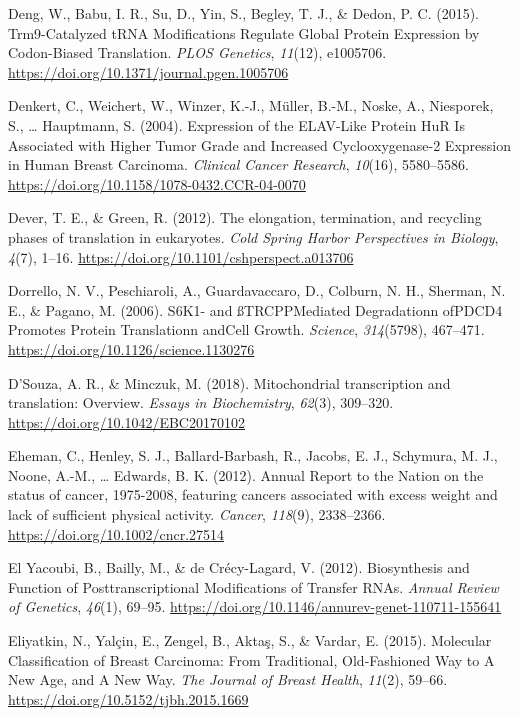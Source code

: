 \documentclass[12pt,openany]{book}
\begin{document}
\hypertarget{ref-Deng2015}{}
Deng, W., Babu, I. R., Su, D., Yin, S., Begley, T. J., \& Dedon, P. C.
(2015). Trm9-Catalyzed tRNA Modifications Regulate Global Protein
Expression by Codon-Biased Translation. \emph{PLOS Genetics},
\emph{11}(12), e1005706.
\url{https://doi.org/10.1371/journal.pgen.1005706}

\hypertarget{ref-Denkert2004}{}
Denkert, C., Weichert, W., Winzer, K.-J., Müller, B.-M., Noske, A.,
Niesporek, S., \ldots{} Hauptmann, S. (2004). Expression of the
ELAV-Like Protein HuR Is Associated with Higher Tumor Grade and
Increased Cyclooxygenase-2 Expression in Human Breast Carcinoma.
\emph{Clinical Cancer Research}, \emph{10}(16), 5580--5586.
\url{https://doi.org/10.1158/1078-0432.CCR-04-0070}

\hypertarget{ref-Dever2012}{}
Dever, T. E., \& Green, R. (2012). The elongation, termination, and
recycling phases of translation in eukaryotes. \emph{Cold Spring Harbor
Perspectives in Biology}, \emph{4}(7), 1--16.
\url{https://doi.org/10.1101/cshperspect.a013706}

\hypertarget{ref-Dorrello2006}{}
Dorrello, N. V., Peschiaroli, A., Guardavaccaro, D., Colburn, N. H.,
Sherman, N. E., \& Pagano, M. (2006). S6K1- and ßTRCPPMediated
Degradationn ofPDCD4 Promotes Protein Translationn andCell Growth.
\emph{Science}, \emph{314}(5798), 467--471.
\url{https://doi.org/10.1126/science.1130276}

\hypertarget{ref-DSouza2018}{}
D'Souza, A. R., \& Minczuk, M. (2018). Mitochondrial transcription and
translation: Overview. \emph{Essays in Biochemistry}, \emph{62}(3),
309--320. \url{https://doi.org/10.1042/EBC20170102}

\hypertarget{ref-Eheman2012}{}
Eheman, C., Henley, S. J., Ballard-Barbash, R., Jacobs, E. J., Schymura,
M. J., Noone, A.-M., \ldots{} Edwards, B. K. (2012). Annual Report to
the Nation on the status of cancer, 1975-2008, featuring cancers
associated with excess weight and lack of sufficient physical activity.
\emph{Cancer}, \emph{118}(9), 2338--2366.
\url{https://doi.org/10.1002/cncr.27514}

\hypertarget{ref-ElYacoubi2012}{}
El Yacoubi, B., Bailly, M., \& de Crécy-Lagard, V. (2012). Biosynthesis
and Function of Posttranscriptional Modifications of Transfer RNAs.
\emph{Annual Review of Genetics}, \emph{46}(1), 69--95.
\url{https://doi.org/10.1146/annurev-genet-110711-155641}

\hypertarget{ref-Eliyatkin2015}{}
Eliyatkin, N., Yalçin, E., Zengel, B., Aktaş, S., \& Vardar, E. (2015).
Molecular Classification of Breast Carcinoma: From Traditional,
Old-Fashioned Way to A New Age, and A New Way. \emph{The Journal of
Breast Health}, \emph{11}(2), 59--66.
\url{https://doi.org/10.5152/tjbh.2015.1669}
\end{document}
